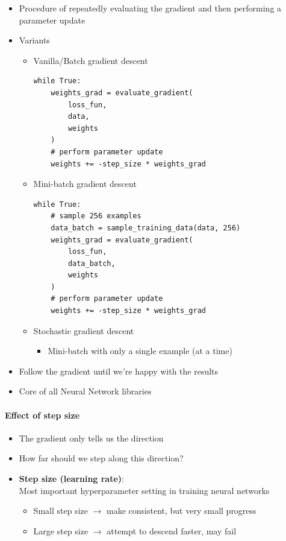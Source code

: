 \documentclass{scrartcl}
\begin{document}
\begin{itemize}
	\item Procedure of repeatedly evaluating the gradient and then performing a parameter update
	\item Variants
	\begin{itemize}
		\item Vanilla/Batch gradient descent
		\begin{lstlisting}
while True:
	weights_grad = evaluate_gradient(
		loss_fun, 
		data, 
		weights
	)
	# perform parameter update
	weights += -step_size * weights_grad
		\end{lstlisting}
		\item Mini-batch gradient descent
		\begin{lstlisting}
while True:
	# sample 256 examples
	data_batch = sample_training_data(data, 256)
	weights_grad = evaluate_gradient(
		loss_fun, 
		data_batch, 
		weights
	)
	# perform parameter update
	weights += -step_size * weights_grad
		\end{lstlisting}
		\item Stochastic gradient descent
		\begin{itemize}
			\item Mini-batch with only a single example (at a time)
		\end{itemize}
	\end{itemize}	
	\item Follow the gradient until we're happy with the results
	\item Core of all Neural Network libraries
\end{itemize}

\paragraph{Effect of step size}

\begin{itemize}
	\item The gradient only tells us the direction
	\item How far should we step along this direction?
	\item \textbf{Step size (learning rate)}: \\
	Most important hyperparameter setting in training neural networks
	\begin{itemize}
		\item Small step size $ \rightarrow $ make consistent, but very small progress
		\item Large step size $ \rightarrow $ attempt to descend faster, may fail
	\end{itemize}
\end{itemize}
\end{document}
